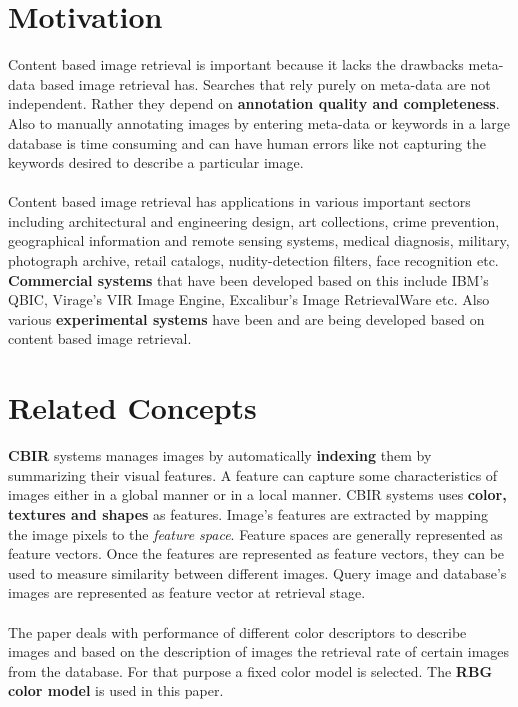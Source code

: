 \documentclass[pstricks,10pt,notitlepage]{report}
\begin{document}
\section{Motivation}
Content based image retrieval is important because it lacks the drawbacks meta-data based image retrieval has. Searches that rely purely on meta-data are not independent. Rather they depend on \textbf{annotation quality and completeness}. Also to manually annotating images by entering meta-data  or keywords in a large database is time consuming and can have human errors like not capturing the keywords desired to describe a particular image.\\
\\
Content based image retrieval has applications in various important sectors including architectural and engineering design, art collections, crime prevention, geographical information and remote sensing systems, medical diagnosis, military, photograph archive, retail catalogs, nudity-detection filters, face recognition etc. \textbf{Commercial systems} that have been developed based on this include IBM’s QBIC, Virage’s VIR Image Engine, Excalibur’s Image RetrievalWare etc. Also various \textbf{experimental systems} have been and are being developed based on content based image retrieval.

\section{Related Concepts}
\textbf{CBIR} systems manages images by automatically \textbf{indexing} them by summ{}arizing their visual features\cite{n1,n2,n3,n4,n5,n6,n7,n8,n9}. A feature can capture some characteristics of images either in a global manner or in a local manner\cite{n5}. CBIR systems uses \textbf{color, textures and shapes} as features. Image’s features are extracted by mapping the image pixels to the \textit{feature space}. Feature spaces are generally represented as feature vectors. Once the features are represented as feature vectors, they can be used to measure similarity between different images. Query image and database's images are represented as feature vector at retrieval stage.\cite{n8}\\
\\
The paper deals with performance of different color descriptors to describe images and based on the description of images the retrieval rate of certain images from the database. For that purpose a fixed color model is selected. The \textbf{RBG color model} is used in this paper. 
\end{document}
